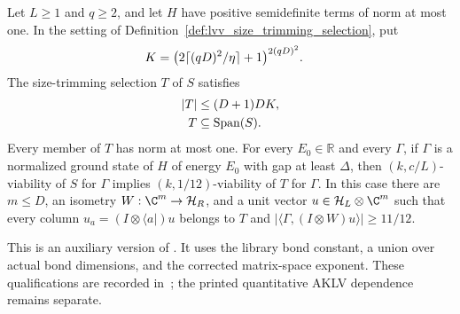 \begin{lemma}
    \label{thm:lvv_size_trimmed_family}
    \leanok
    Let $L\ge1$ and $q\ge2$, and let $H$ have positive semidefinite terms of
    norm at most one. In the setting of
    Definition~\ref{def:lvv_size_trimming_selection}, put
    \begin{align}
        K & =\bigl(2\lceil(qD)^2/\eta\rceil+1\bigr)^{2(qD)^2}.\notag
    \end{align}
    The size-trimming selection $T$ of $S$ satisfies
    \begin{align}
        |T| & \le(D+1)DK,\notag                      \\
        T   & \subseteq\operatorname{Span}(S).\notag
    \end{align}
    Every member of $T$ has norm at most one.
    For every $E_0\in\mathbb R$ and every $\Gamma$, if $\Gamma$ is a normalized
    ground state of $H$ of energy $E_0$ with gap at least $\Delta$, then
    $(k,c/L)$-viability of $S$ for $\Gamma$ implies
    $(k,1/12)$-viability of $T$ for $\Gamma$.
    In this case there are $m\le D$, an isometry
    $W:\C^m\to\mathcal H_R$, and a unit vector
    $u\in\mathcal H_L\otimes\C^m$ such that every column
    $u_a=(I\otimes\langle a|)u$ belongs to $T$ and
    $|\langle\Gamma,(I\otimes W)u\rangle|\ge11/12$.

    This is an auxiliary version of
    \cite[Claim~2.7, source lines 472--478 and 520--527]{Landau2015Polynomial}.
    It uses the library bond constant, a union over actual bond dimensions,
    and the corrected matrix-space exponent. These qualifications are
    recorded in~\cite{gap:lvv13_constant_bond,gap:lvv13_trace_norm_net};
    the printed quantitative AKLV dependence remains separate.
\end{lemma}
